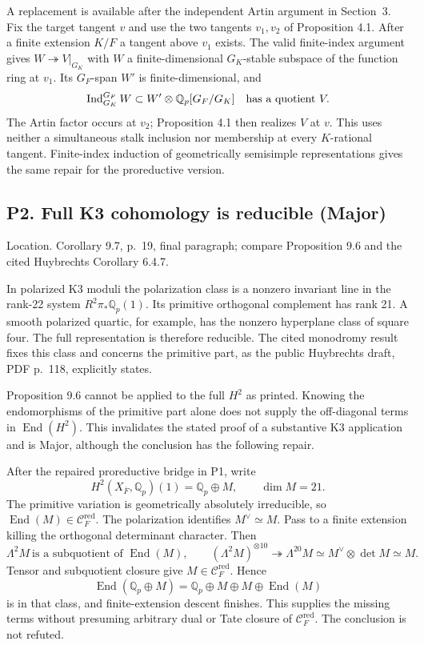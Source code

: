 \documentclass[10pt]{article}
\begin{document}
A replacement is available after the independent Artin argument in Section 3. Fix the target tangent \(v\) and use the two tangents \(v_1,v_2\) of Proposition 4.1. After a finite extension \(K/F\) a tangent above \(v_1\) exists. The valid finite-index argument gives \(W\twoheadrightarrow V|_{G_K}\) with \(W\) a finite-dimensional \(G_K\)-stable subspace of the function ring at \(v_1\). Its \(G_F\)-span \(W'\) is finite-dimensional, and \[\operatorname{Ind}_{G_K}^{G_F}W
       \subset W'\otimes\mathbb Q_p[G_F/G_K]
       \quad\hbox{has a quotient }V .\] The Artin factor occurs at \(v_2\); Proposition 4.1 then realizes \(V\) at \(v\). This uses neither a simultaneous stalk inclusion nor membership at every \(K\)-rational tangent. Finite-index induction of geometrically semisimple representations gives the same repair for the proreductive version.\par
\subsection*{P2. Full K3 cohomology is reducible (Major)}
Location. Corollary 9.7, p. 19, final paragraph; compare Proposition 9.6 and the cited Huybrechts Corollary 6.4.7.\par
In polarized K3 moduli the polarization class is a nonzero invariant line in the rank-22 system \(R^2\pi_*\mathbb Q_p(1)\). Its primitive orthogonal complement has rank 21. A smooth polarized quartic, for example, has the nonzero hyperplane class of square four. The full representation is therefore reducible. The cited monodromy result fixes this class and concerns the primitive part, as the public Huybrechts draft, PDF p. 118, explicitly states.\par
Proposition 9.6 cannot be applied to the full \(H^2\) as printed. Knowing the endomorphisms of the primitive part alone does not supply the off-diagonal terms in \(\operatorname{End}(H^2)\). This invalidates the stated proof of a substantive K3 application and is Major, although the conclusion has the following repair.\par
After the repaired proreductive bridge in P1, write \[H^2(X_{\overline F},\mathbb Q_p)(1)=\mathbb Q_p\oplus M,\qquad \dim M=21 .\] The primitive variation is geometrically absolutely irreducible, so \(\operatorname{End}(M)\in\mathcal C_F^{\mathrm{red}}\). The polarization identifies \(M^\vee\simeq M\). Pass to a finite extension killing the orthogonal determinant character. Then \[\Lambda^2M\ \text{is a subquotient of }\operatorname{End}(M),\qquad
 (\Lambda^2M)^{\otimes10}\twoheadrightarrow
 \Lambda^{20}M\simeq M^\vee\otimes\det M\simeq M .\] Tensor and subquotient closure give \(M\in\mathcal C_F^{\mathrm{red}}\). Hence \[\operatorname{End}(\mathbb Q_p\oplus M)=\mathbb Q_p\oplus M\oplus M\oplus\operatorname{End}(M)\] is in that class, and finite-extension descent finishes. This supplies the missing terms without presuming arbitrary dual or Tate closure of \(\mathcal C_F^{\mathrm{red}}\). The conclusion is not refuted.\par
\end{document}
